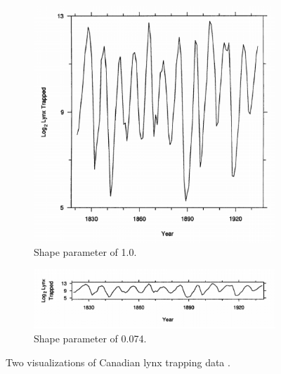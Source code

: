\begin{figure}
	\centering
	\begin{subfigure}[b]{0.45\textwidth}
		\includegraphics[width=\textwidth]{figures/eps/ratioBad.eps}
		\caption{Shape parameter of 1.0.}
		\label{fig:ratioBad}
	\end{subfigure}	
	\begin{subfigure}[b]{0.45\textwidth}
		\includegraphics[width=\textwidth]{figures/eps/ratioGood.eps}
		\caption{Shape parameter of 0.074.}
		\label{fig:ratioGood}
	\end{subfigure}
	\caption{Two visualizations of Canadian lynx trapping data \cite{cleveland1988}.}
	\label{fig:ratio}
\end{figure}

